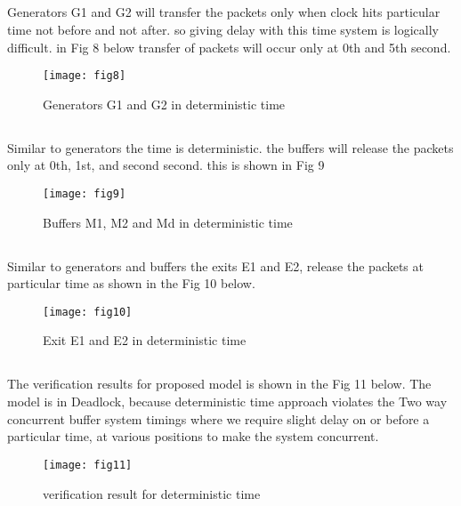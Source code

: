 \documentclass[letterpaper]{article}
\begin{document}
\subsection{} Generators G1 and G2 will transfer the packets only when clock hits particular time not before and not after. so giving delay with this time system is logically difficult. in Fig 8 below transfer of packets will occur only at 0th and 5th second.
\begin{figure}[bpht!]
\centering
	\texttt{[image: fig8]}
		\caption{Generators G1 and G2 in deterministic time}
	\label{Fig 8}
\end{figure}

\subsection{} Similar to generators the time is deterministic. the buffers will release the packets only at 0th, 1st, and second second. this is shown in Fig 9
\begin{figure}[bpht!]
\centering
	\texttt{[image: fig9]}
		\caption{Buffers M1, M2 and Md in deterministic time}
	\label{Fig 9}
\end{figure}

\subsection{} Similar to generators and buffers the exits E1 and E2, release the packets at particular time as shown in the Fig 10 below.
\begin{figure}[bpht!]
\centering
	\texttt{[image: fig10]}
		\caption{Exit E1 and E2 in deterministic time}
	\label{Fig10}
\end{figure}

\subsection{} The verification results for proposed model is shown in the Fig 11 below. The model is in Deadlock, because deterministic time approach violates the Two way concurrent buffer system timings where we require slight delay on or before a particular time, at various positions to make the system concurrent.
\begin{figure}[bpht!]
\centering
	\texttt{[image: fig11]}
		\caption{verification result for deterministic time}
	\label{Fig11}
\end{figure}
\end{document}

